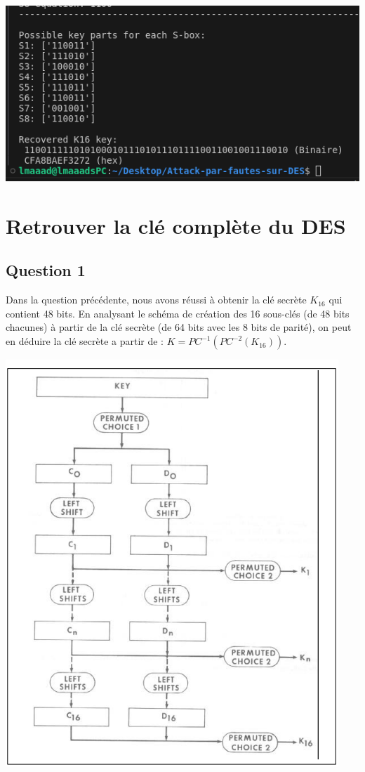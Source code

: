 \documentclass[12pt,a4paper]{report}
\begin{document}
\begin{center}\includegraphics[scale=0.4]{images/resultat2}\end{center}

\section{Retrouver la clé complète du DES}

\subsection{Question 1}

Dans la question précédente, nous avons réussi à obtenir la clé secrète $K_{16}$ qui contient 48 bits. En analysant le schéma de création des 16 sous-clés (de 48 bits chacunes) à partir de la clé secrète (de 64 bits avec les 8 bits de parité), on peut en déduire la clé secrète a partir de : $K=PC^{-1}(PC^{-2}(K_{16}))$.

\begin{center}\includegraphics[scale=0.5]{images/key_CI-CD.png}\end{center}
\end{document}
